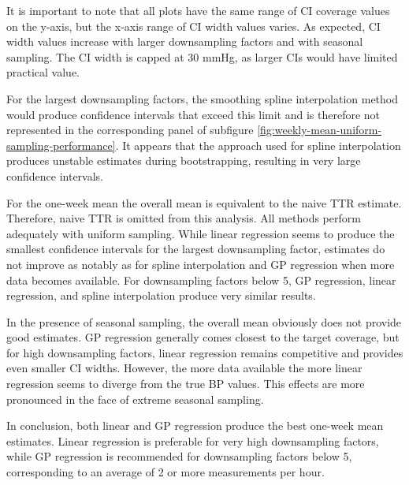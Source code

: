 It is important to note that all plots have the same range of CI coverage values
on the y-axis, but the x-axis range of CI width values varies. As expected,
CI width values increase with larger downsampling factors and with seasonal sampling.
The CI width is capped at 30 mmHg, as larger CIs would have limited practical value.

For the largest downsampling factors, the smoothing spline interpolation method
would produce confidence intervals that exceed this limit and is therefore not
represented in the corresponding panel of subfigure
\ref{fig:weekly-mean-uniform-sampling-performance}.
It appears that the approach used for spline interpolation produces unstable
estimates during bootstrapping, resulting in very large confidence intervals.


For the one-week mean the overall mean is equivalent to the naive TTR estimate.
Therefore, naive TTR is omitted from this analysis.
All methods perform adequately with uniform sampling.
While linear regression seems to produce the smallest confidence intervals for
the largest downsampling factor, estimates do not improve as notably as for
spline interpolation and GP regression when more data becomes available.
For downsampling factors below 5, GP regression, linear regression, and spline
interpolation produce very similar results.

In the presence of seasonal sampling, the overall mean obviously does not
provide good estimates. GP regression generally
comes closest to the target coverage, but for high downsampling factors,
linear regression remains competitive and provides even smaller CI widths.
However, the more data available the more linear regression seems to
diverge from the true BP values. This effects are more pronounced in the face
of extreme seasonal sampling.


In conclusion, both linear and GP regression produce the best one-week mean estimates.
Linear regression is preferable for very high downsampling factors,
while GP regression is recommended for downsampling factors below 5,
corresponding to an average of 2 or more measurements per hour.

